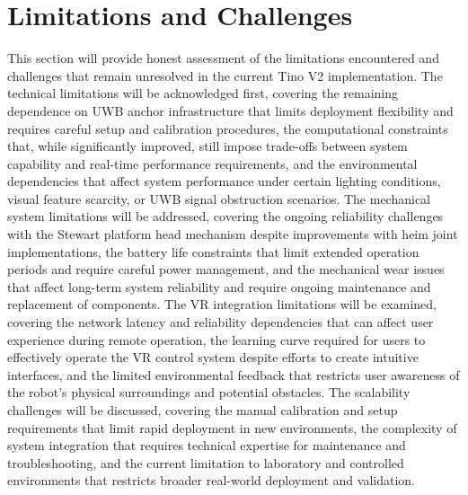 \section{Limitations and Challenges}
This section will provide honest assessment of the limitations encountered and challenges that remain unresolved in the current Tino V2 implementation. The technical limitations will be acknowledged first, covering the remaining dependence on UWB anchor infrastructure that limits deployment flexibility and requires careful setup and calibration procedures, the computational constraints that, while significantly improved, still impose trade-offs between system capability and real-time performance requirements, and the environmental dependencies that affect system performance under certain lighting conditions, visual feature scarcity, or UWB signal obstruction scenarios. The mechanical system limitations will be addressed, covering the ongoing reliability challenges with the Stewart platform head mechanism despite improvements with heim joint implementations, the battery life constraints that limit extended operation periods and require careful power management, and the mechanical wear issues that affect long-term system reliability and require ongoing maintenance and replacement of components. The VR integration limitations will be examined, covering the network latency and reliability dependencies that can affect user experience during remote operation, the learning curve required for users to effectively operate the VR control system despite efforts to create intuitive interfaces, and the limited environmental feedback that restricts user awareness of the robot's physical surroundings and potential obstacles. The scalability challenges will be discussed, covering the manual calibration and setup requirements that limit rapid deployment in new environments, the complexity of system integration that requires technical expertise for maintenance and troubleshooting, and the current limitation to laboratory and controlled environments that restricts broader real-world deployment and validation.

